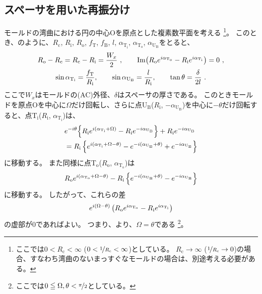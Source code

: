 \subsection{スペーサを用いた再振分け}
モールドの湾曲における円の中心Oを原点とした複素数平面を考える
\footnote{ここでは$0 < R_\mathrm c < \infty$ ($0 < \nicefrac1{R_\mathrm c} < \infty$)としている。
$R_\mathrm c \to \infty$ ($\nicefrac1{R_\mathrm c} \to 0$)の場合、すなわち湾曲のないまっすぐなモールドの場合は、別途考える必要がある。}。
このとき、のように、$R_\mathrm c$, $R_\mathrm i$, $R_\mathrm o$, $f_\mathrm T$, $f_\mathrm B$, $l$, $\alpha_{\mathrm T_\mathrm i}$, $\alpha_{\mathrm T_\mathrm o}$, $\alpha_{\mathrm U_\mathrm B}$をとると、
\begin{subequations}
\begin{gather}
  \label{eq:constraintUpoint1}
  R_\mathrm o - R_\mathrm c = R_\mathrm c - R_\mathrm i = \frac{W_x}2~, \qquad
  \operatorname{Im}\!\left(R_\mathrm oe^{i\alpha_{\mathrm T_\mathrm o}} - R_\mathrm ie^{i\alpha_{\mathrm T_\mathrm i}}\right)
  = 0~,\\
  \label{eq:constraintUpoint2}
  \sin\alpha_{\mathrm T_\mathrm i} = \frac{f_\mathrm T}{R_\mathrm i}, \qquad
  \sin\alpha_{\mathrm U_\mathrm B} = \frac l{R_\mathrm i}, \qquad
  \tan\theta = \frac\delta{2l}~.
\end{gather}
\end{subequations}
ここで$W_x$はモールドの(AC)外径、$\delta$はスペーサの厚さである。
このときモールドを原点Oを中心に$\Omega$だけ回転し、さらに点U$_\mathrm B$($R_\mathrm i$, $-\alpha_{\mathrm U_\mathrm B}$)を中心に$-\theta$だけ回転すると、点T$_\mathrm i$($R_\mathrm i$, $\alpha_{\mathrm T_\mathrm i}$)は、
\begin{align}
  \notag
  & e^{-i\theta}\!\left\{R_\mathrm ie^{i(\alpha_{\mathrm T_\mathrm i} + \Omega)} - R_\mathrm ie^{-i\alpha_{\mathrm U_\mathrm B}}\right\}
    +R_\mathrm ie^{-i\alpha_{\mathrm U_\mathrm B}}\\
  &= R_\mathrm i
     \left\{
       e^{i(\alpha_{\mathrm T_\mathrm i} + \Omega - \theta)} - e^{-i(\alpha_{\mathrm U_\mathrm B} + \theta)} + e^{-i\alpha_{\mathrm U_\mathrm B}}
     \right\}
  \label{eq:afterftUpoint}
\end{align}
に移動する。
また同様に点T$_\mathrm o$($R_\mathrm o$, $\alpha_{\mathrm T_\mathrm o}$)は
\begin{align*}
  \notag
  R_\mathrm oe^{i(\alpha_{\mathrm T_\mathrm o} + \Omega - \theta)}
  -R_\mathrm i\left\{e^{-i(\alpha_{\mathrm U_\mathrm B} + \theta)}-e^{-i\alpha_{\mathrm U_\mathrm B}}\right\}
\end{align*}
に移動する。
したがって、これらの差
\begin{equation}
  \notag
  e^{i(\Omega - \theta)}\left(R_\mathrm oe^{i\alpha_{\mathrm T_\mathrm o}} - R_\mathrm ie^{i\alpha_{\mathrm T_\mathrm i}}\right)
\end{equation}
の虚部が$0$であればよい。
つまり、より、$\Omega = \theta$である
\footnote{ここでは$0 \leqq \Omega, \theta < \nicefrac \pi2$としている。}。

